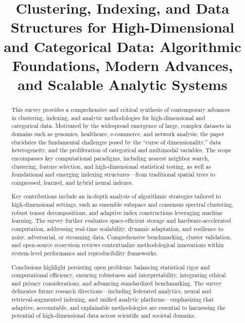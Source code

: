\title{Clustering, Indexing, and Data Structures for High-Dimensional and Categorical Data: Algorithmic Foundations, Modern Advances, and Scalable Analytic Systems}
\maketitle

\begin{abstract}
This survey provides a comprehensive and critical synthesis of contemporary advances in clustering, indexing, and analytic methodologies for high-dimensional and categorical data. Motivated by the widespread emergence of large, complex datasets in domains such as genomics, healthcare, e-commerce, and network analysis, the paper elucidates the fundamental challenges posed by the “curse of dimensionality,” data heterogeneity, and the proliferation of categorical and multimodal variables. The scope encompasses key computational paradigms, including nearest neighbor search, clustering, feature selection, and high-dimensional statistical testing, as well as foundational and emerging indexing structures—from traditional spatial trees to compressed, learned, and hybrid neural indexes.

Key contributions include an in-depth analysis of algorithmic strategies tailored to high-dimensional settings, such as ensemble subspace and consensus spectral clustering, robust tensor decompositions, and adaptive index constructions leveraging machine learning. The survey further evaluates space-efficient storage and hardware-accelerated computation, addressing real-time scalability, dynamic adaptation, and resilience to noisy, adversarial, or streaming data. Comprehensive benchmarking, cluster validation, and open-source ecosystem reviews contextualize methodological innovations within system-level performance and reproducibility frameworks.

Conclusions highlight persisting open problems: balancing statistical rigor and computational efficiency, ensuring robustness and interpretability, integrating ethical and privacy considerations, and advancing standardized benchmarking. The survey delineates future research directions—including federated analytics, neural and retrieval-augmented indexing, and unified analytic platforms—emphasizing that adaptive, accountable, and explainable methodologies are essential to harnessing the potential of high-dimensional data across scientific and societal domains.
\end{abstract}

